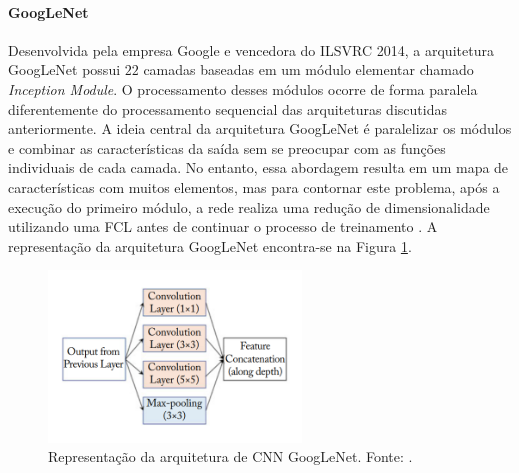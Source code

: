 \paragraph{GoogLeNet} Desenvolvida pela empresa Google e vencedora do ILSVRC 2014, a arquitetura GoogLeNet possui $22$ camadas baseadas em um módulo elementar chamado \emph{Inception Module}. O processamento desses módulos ocorre de forma paralela diferentemente do processamento sequencial das arquiteturas discutidas anteriormente. A ideia central da arquitetura GoogLeNet é paralelizar os módulos e combinar as características da saída sem se preocupar com as funções individuais de cada camada. No entanto, essa abordagem resulta em um mapa de características com muitos elementos, mas para contornar este problema, após a execução do primeiro módulo, a rede realiza uma redução de dimensionalidade utilizando uma FCL antes de continuar o processo de treinamento \cite{ref:khan}. A representação da arquitetura GoogLeNet encontra-se na Figura \ref{img:googlenet}.

\begin{figure}[!ht]
	\centering
	\includegraphics[width=0.6\textwidth]{./img/googlenet}
	\caption{Representação da arquitetura de CNN GoogLeNet. Fonte: \cite{ref:khan}.}
	\label{img:googlenet}
\end{figure}

